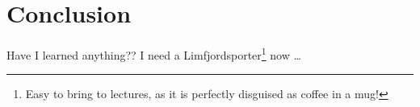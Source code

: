 
\chapter{Conclusion}
\label{chap:conclusion}

Have I learned anything?? I need a Limfjordsporter\footnote{Easy to bring to
  lectures, as it is perfectly disguised as coffee in a mug!} now \ldots
